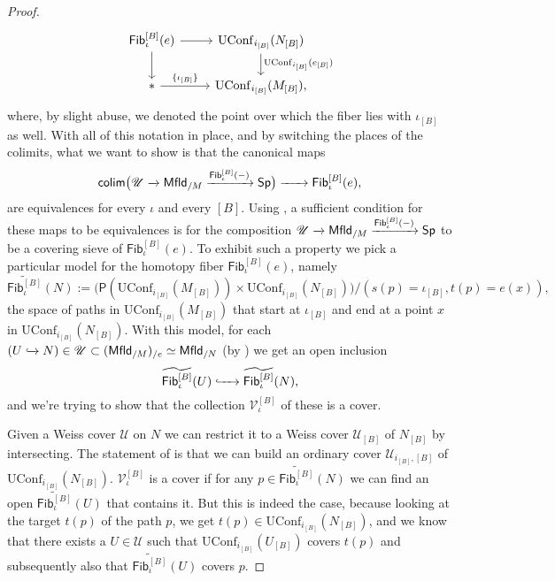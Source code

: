 \documentclass[../text]{subfiles}
\begin{document}
\begin{proof}
\begin{equation}
        \begin{tikzcd}
            \mathsf{Fib}_\iota^{[B]}(e) \arrow[d] \arrow[r] & \mathrm{UConf}_{i_{[B]}}(N_{[B]}) \arrow[d, "\mathrm{UConf}_{i_{[B]}}(e_{[B]})"] \\
            * \arrow[r, "\{\iota_{[B]}\}"] & \mathrm{UConf}_{i_{[B]}}(M_{[B]}),
        \end{tikzcd}
    \end{equation}
    where, by slight abuse, we denoted the point over which the fiber lies with $\iota_{[B]}$ as well. With all of this notation in place, and by switching the places of the colimits, what we want to show is that the canonical maps
    \begin{equation}
        \mathsf{colim} \big( \mathscr{U} \xrightarrow{} \mfld[r]_{/M} \xrightarrow{\mathsf{Fib}_{\iota}^{[B]}(-)} \mathsf{Sp} \big) \xrightarrow{\ \ \ \ \ } \mathsf{Fib}_{\iota}^{[B]}(e),
    \end{equation}
    are equivalences for every $\iota$ and every $[B]$. Using \cite[Prop.A.3.2]{lurie_ha}, a sufficient condition for these maps to be equivalences is for the composition $\mathscr{U} \xrightarrow{} \mfld[r]_{/M} \xrightarrow{\mathsf{Fib}_{\iota}^{[B]}(-)} \mathsf{Sp}$ to be a covering sieve of $\mathsf{Fib}_{\iota}^{[B]}(e)$. To exhibit such a property we pick a particular model for the homotopy fiber $\mathsf{Fib}_{\iota}^{[B]}(e)$, namely
    \begin{equation}
        \widetilde{\mathsf{Fib}_{\iota}^{[B]}}(N) := \big( \mathsf{P}(\mathrm{UConf}_{i_{[B]}}(M_{[B]})) \times \mathrm{UConf}_{i_{[B]}}(N_{[B]}) \big) / (s (p) = \iota_{[B]}, t (p) = e(x)),
    \end{equation}
    the space of paths in $\mathrm{UConf}_{i_{[B]}}(M_{[B]})$ that start at $\iota_{[B]}$ and end at a point $x$ in $\mathrm{UConf}_{i_{[B]}}(N_{[B]})$. With this model, for each $(U \xhookrightarrow{} N) \in \mathscr{U} \subset (\mfld[r]_{/M})_{/e} \simeq \mfld[r]_{/N}$ (by ) we get an open inclusion
    \begin{equation}
        \widetilde{\mathsf{Fib}_{\iota}^{[B]}}(U) \xhookrightarrow{\ \ \ \ } \widetilde{\mathsf{Fib}_{\iota}^{[B]}}(N),
    \end{equation}
    and we're trying to show that the collection $\mathscr{V}_{\iota}^{[B]}$ of these is a cover.

    Given a Weiss cover $\mathscr{U}$ on $N$ we can restrict it to a Weiss cover $\mathscr{U}_{[B]}$ of $N_{[B]}$ by intersecting. The statement of  is that we can build an ordinary cover $\mathscr{U}_{i_{[B]},[B]}$ of $\mathrm{UConf}_{i_{[B]}}(N_{[B]})$. $\mathscr{V}_{\iota}^{[B]}$ is a cover if for any $p \in \widetilde{\mathsf{Fib}_{\iota}^{[B]}}(N)$ we can find an open $\widetilde{\mathsf{Fib}_{\iota}^{[B]}}(U)$ that contains it. But this is indeed the case, because looking at the target $t(p)$ of the path $p$, we get $t(p) \in \mathrm{UConf}_{i_{[B]}}(N_{[B]})$, and we know that there exists a $U \in \mathscr{U}$ such that $\mathrm{UConf}_{i_{[B]}}(U_{[B]})$ covers $t(p)$ and subsequently also that $\widetilde{\mathsf{Fib}_{\iota}^{[B]}}(U)$ covers $p$.


\end{proof}
\end{document}
